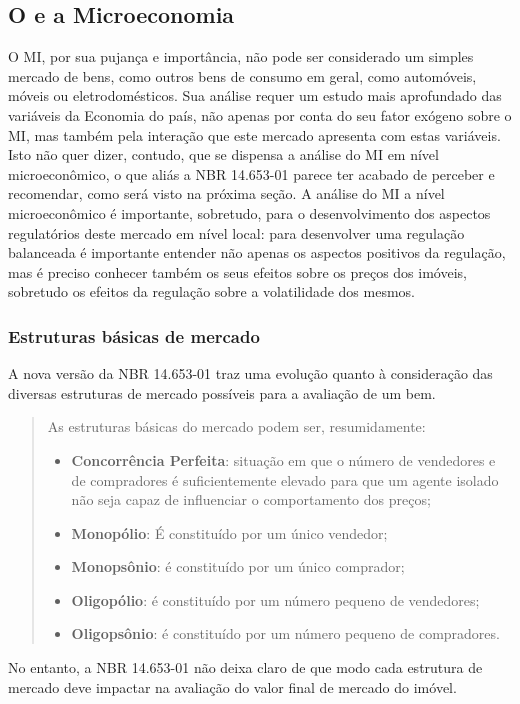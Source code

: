 \documentclass[
	12pt,				%
	oneside,			%
	a4paper,			%
	chapter=TITLE,		%
	section=TITLE,		%
	english,			%
	brazil				%
	]{abntex2}
\begin{document}
\begin{refsection}
\hypertarget{micro}{%
\subsection{\texorpdfstring{O  e a Microeconomia}{O  e a Microeconomia}}\label{micro}}

O \gls{MI}, por sua pujança e importância, não pode ser considerado um simples
mercado de bens, como outros bens de consumo em geral, como automóveis, móveis
ou eletrodomésticos. Sua análise requer um estudo mais aprofundado das variáveis
da Economia do país, não apenas por conta do seu fator exógeno sobre o \gls{MI},
mas também pela interação que este mercado apresenta com estas variáveis. Isto
não quer dizer, contudo, que se dispensa a análise do \gls{MI} em nível
microeconômico, o que aliás a NBR 14.653-01 \autocite*{NBR1465301} parece ter acabado de
perceber e recomendar, como será visto na próxima seção. A análise do \gls{MI} a
nível microeconômico é importante, sobretudo, para o desenvolvimento dos
aspectos regulatórios deste mercado em nível local: para desenvolver uma
regulação balanceada é importante entender não apenas os aspectos positivos da
regulação, mas é preciso conhecer também os seus efeitos sobre os preços dos
imóveis, sobretudo os efeitos da regulação sobre a volatilidade dos mesmos.

\hypertarget{estruturas-buxe1sicas-de-mercado}{%
\subsubsection{Estruturas básicas de mercado}\label{estruturas-buxe1sicas-de-mercado}}

A nova versão da NBR 14.653-01 \autocite*[ix]{NBR1465301} traz uma evolução quanto à
consideração das diversas estruturas de mercado possíveis para a avaliação de um
bem.
\begin{quote}
As estruturas básicas do mercado podem ser, resumidamente:
\begin{itemize}
\item
  \textbf{Concorrência Perfeita}: situação em que o número de vendedores e de
  compradores é suficientemente elevado para que um agente isolado não seja
  capaz de influenciar o comportamento dos preços;
\item
  \textbf{Monopólio}: É constituído por um único vendedor;
\item
  \textbf{Monopsônio}: é constituído por um único comprador;
\item
  \textbf{Oligopólio}: é constituído por um número pequeno de vendedores;
\item
  \textbf{Oligopsônio}: é constituído por um número pequeno de compradores.
\end{itemize}
\end{quote}
No entanto, a NBR 14.653-01 \autocite*{NBR1465301} não deixa claro de que modo cada
estrutura de mercado deve impactar na avaliação do valor final de mercado do
imóvel.


\end{refsection}
\end{document}
